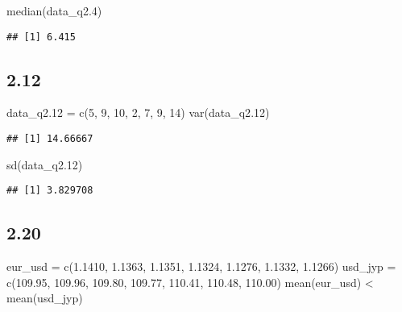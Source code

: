 \documentclass[
]{article}
\newenvironment{Shaded}{\begin{snugshade}}{\end{snugshade}}
\newcommand{\DecValTok}[1]{\textcolor[rgb]{0.00,0.00,0.81}{#1}}
\newcommand{\FloatTok}[1]{\textcolor[rgb]{0.00,0.00,0.81}{#1}}
\newcommand{\FunctionTok}[1]{\textcolor[rgb]{0.00,0.00,0.00}{#1}}
\newcommand{\NormalTok}[1]{#1}
\newcommand{\OtherTok}[1]{\textcolor[rgb]{0.56,0.35,0.01}{#1}}
\newcommand{\SpecialCharTok}[1]{\textcolor[rgb]{0.00,0.00,0.00}{#1}}
\begin{document}
\begin{Shaded}
\begin{Highlighting}[]
\FunctionTok{median}\NormalTok{(data\_q2}\FloatTok{.4}\NormalTok{)}
\end{Highlighting}
\end{Shaded}

\begin{verbatim}
## [1] 6.415
\end{verbatim}

\hypertarget{section-2}{%
\subsection{2.12}\label{section-2}}

\begin{Shaded}
\begin{Highlighting}[]
\NormalTok{data\_q2}\FloatTok{.12} \OtherTok{=} \FunctionTok{c}\NormalTok{(}\DecValTok{5}\NormalTok{, }\DecValTok{9}\NormalTok{, }\DecValTok{10}\NormalTok{, }\DecValTok{2}\NormalTok{, }\DecValTok{7}\NormalTok{, }\DecValTok{9}\NormalTok{, }\DecValTok{14}\NormalTok{)}
\FunctionTok{var}\NormalTok{(data\_q2}\FloatTok{.12}\NormalTok{)}
\end{Highlighting}
\end{Shaded}

\begin{verbatim}
## [1] 14.66667
\end{verbatim}

\begin{Shaded}
\begin{Highlighting}[]
\FunctionTok{sd}\NormalTok{(data\_q2}\FloatTok{.12}\NormalTok{)}
\end{Highlighting}
\end{Shaded}

\begin{verbatim}
## [1] 3.829708
\end{verbatim}

\hypertarget{section-3}{%
\subsection{2.20}\label{section-3}}

\begin{Shaded}
\begin{Highlighting}[]
\NormalTok{eur\_usd }\OtherTok{=} \FunctionTok{c}\NormalTok{(}\FloatTok{1.1410}\NormalTok{, }\FloatTok{1.1363}\NormalTok{, }\FloatTok{1.1351}\NormalTok{, }\FloatTok{1.1324}\NormalTok{, }\FloatTok{1.1276}\NormalTok{, }\FloatTok{1.1332}\NormalTok{, }\FloatTok{1.1266}\NormalTok{)}
\NormalTok{usd\_jyp }\OtherTok{=} \FunctionTok{c}\NormalTok{(}\FloatTok{109.95}\NormalTok{, }\FloatTok{109.96}\NormalTok{, }\FloatTok{109.80}\NormalTok{, }\FloatTok{109.77}\NormalTok{, }\FloatTok{110.41}\NormalTok{, }\FloatTok{110.48}\NormalTok{, }\FloatTok{110.00}\NormalTok{)}
\FunctionTok{mean}\NormalTok{(eur\_usd) }\SpecialCharTok{\textless{}} \FunctionTok{mean}\NormalTok{(usd\_jyp)}
\end{Highlighting}
\end{Shaded}
\end{document}

